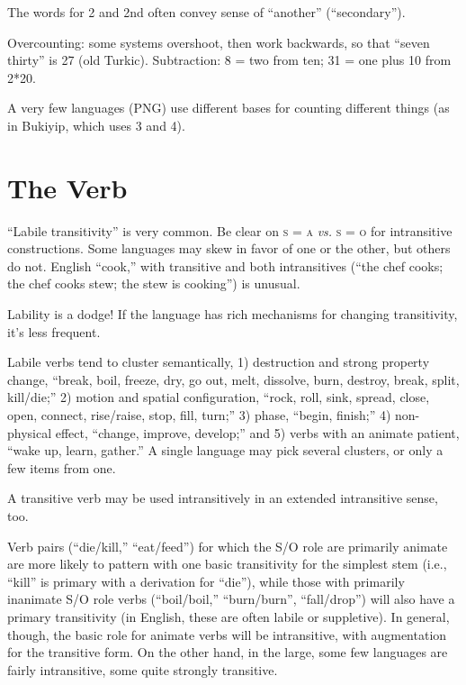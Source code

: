 \documentclass[11pt]{article}
\newcommand{\I}[1]{\textsc{#1}}   %
\begin{document}
The words for 2 and 2nd often convey sense of ``another''
(``secondary''). 

Overcounting: some systems overshoot, then work backwards, so that
``seven thirty'' is 27 (old Turkic).  Subtraction: 8 = two from ten;
31 = one plus 10 from 2*20.

A very few languages (PNG) use different bases for counting different
things (as in Bukiyip, which uses 3 and 4).


\section{The Verb}
``Labile transitivity'' is very common.  Be clear on \I{s = a}
\textit{vs.} \I{s = o} for intransitive constructions.  Some languages
may skew in favor of one or the other, but others do not.  English
``cook,'' with transitive and both intransitives (``the chef cooks;
the chef cooks stew; the stew is cooking'') is unusual.

Lability is a dodge!  If the language has rich mechanisms for changing
transitivity, it's less frequent.

Labile verbs tend to cluster semantically, 1) destruction and strong
property change, ``break, boil, freeze, dry, go out, melt, dissolve,
burn, destroy, break, split, kill/die;'' 2) motion and spatial
configuration, ``rock, roll, sink, spread, close, open, connect,
rise/raise, stop, fill, turn;'' 3) phase, ``begin, finish;'' 4)
non-physical effect, ``change, improve, develop;'' and 5) verbs with
an animate patient, ``wake up, learn, gather.''  A single language may
pick several clusters, or only a few items from one.

A transitive verb may be used intransitively in an extended
intransitive sense, too.

Verb pairs (``die/kill,'' ``eat/feed'') for which the S/O role are
primarily animate are more likely to pattern with one basic
transitivity for the simplest stem (i.e., ``kill'' is primary with a
derivation for ``die''), while those with primarily inanimate S/O role
verbs (``boil/boil,'' ``burn/burn'', ``fall/drop'') will also have a
primary transitivity (in English, these are often labile or
suppletive).  In general, though, the basic role for animate verbs
will be intransitive, with augmentation for the transitive form.  On
the other hand, in the large, some few languages are fairly
intransitive, some quite strongly transitive.
\end{document}
